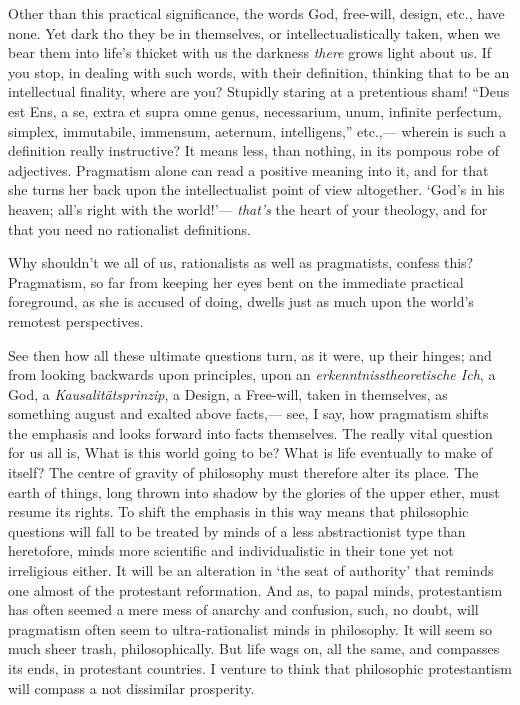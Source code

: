 \documentclass[]{article}
\begin{document}
Other than this practical significance, the words God, free-will, design, etc., have none. Yet dark tho they be in themselves, or intellectualistically taken, when we bear them into life's thicket with us the darkness \emph{there} grows light about us. If you stop, in dealing with such words, with their definition, thinking that to be an intellectual finality, where are you? Stupidly staring at a pretentious sham! ``Deus est Ens, a se, extra et supra omne genus, necessarium, unum, infinite perfectum, simplex, immutabile, immensum, aeternum, intelligens,'' etc.,--- wherein is such a definition really instructive? It means less, than nothing, in its pompous robe of adjectives. Pragmatism alone can read a positive meaning into it, and for that she turns her back upon the intellectualist point of view altogether. `God's in his heaven; all's right with the world!'--- \emph{that's} the heart of your theology, and for that you need no rationalist definitions.

Why shouldn't we all of us, rationalists as well as pragmatists, confess this? Pragmatism, so far from keeping her eyes bent on the immediate practical foreground, as she is accused of doing, dwells just as much upon the world's remotest perspectives.

See then how all these ultimate questions turn, as it were, up their hinges; and from looking backwards upon principles, upon an \emph{erkenntnisstheoretische Ich}, a God, a \emph{Kausalit\"atsprinzip}, a Design, a Free-will, taken in themselves, as something august and exalted above facts,--- see, I say, how pragmatism shifts the emphasis and looks forward into facts themselves. The really vital question for us all is, What is this world going to be? What is life eventually to make of itself? The centre of gravity of philosophy must therefore alter its place. The earth of things, long thrown into shadow by the glories of the upper ether, must resume its rights. To shift the emphasis in this way means that philosophic questions will fall to be treated by minds of a less abstractionist type than heretofore, minds more scientific and individualistic in their tone yet not irreligious either. It will be an alteration in `the seat of authority' that reminds one almost of the protestant reformation. And as, to papal minds, protestantism has often seemed a mere mess of anarchy and confusion, such, no doubt, will pragmatism often seem to ultra-rationalist minds in philosophy. It will seem so much sheer trash, philosophically. But life wags on, all the same, and compasses its ends, in protestant countries. I venture to think that philosophic protestantism will compass a not dissimilar prosperity. 
\end{document}
